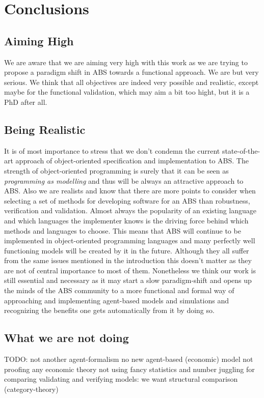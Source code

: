 \chapter{Conclusions}
\label{chap:concl}


\section{Aiming High}
We are aware that we are aiming very high with this work as we are trying to propose a paradigm shift in ABS towards a functional approach. We are but very serious. We think that all objectives are indeed very possible and realistic, except maybe for the functional validation, which may aim a bit too hight, but it is a PhD after all. 

\section{Being Realistic}
It is of most importance to stress that we don't condemn the current state-of-the-art approach of object-oriented specification and implementation to ABS. The strength of object-oriented programming is surely that it can be seen as \textit{programming as modelling} and thus will be always an attractive approach to ABS. Also we are realists and know that there are more points to consider when selecting a set of methods for developing software for an ABS than robustness, verification and validation. Almost always the popularity of an existing language and which languages the implementer knows is the driving force behind which methods and languages to choose. This means that ABS will continue to be implemented in object-oriented programming languages and many perfectly well functioning models will be created by it in the future. Although they all suffer from the same issues mentioned in the introduction this doesn't matter as they are not of central importance to most of them.
Nonetheless we think our work is still essential and necessary as it may start a slow paradigm-shift and opens up the minds of the ABS community to a more functional and formal way of approaching and implementing agent-based models and simulations and recognizing the benefits one gets automatically from it by doing so.

\section{What we are not doing}
TODO:
not another agent-formalism
no new agent-based (economic) model
not proofing any economic theory
not using fancy statistics and number juggling for comparing validating and verifying models: we want structural comparison (category-theory)
